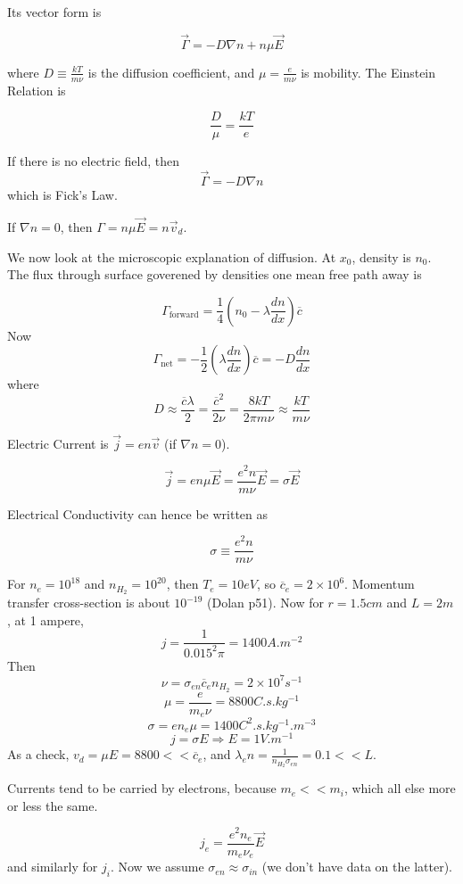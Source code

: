\documentclass[12pt]{article}
\begin{document}
Its vector form is

$$\vec \Gamma = -D\nabla n + n\mu\vec E$$

where $D \equiv \frac{kT}{m\nu}$ is the diffusion coefficient, and $\mu = \frac{e}{m\nu}$ is mobility. The Einstein Relation is

$$\frac{D}{\mu} = \frac{kT}{e}$$

If there is no electric field, then
$$\vec \Gamma = -D\nabla n$$
which is Fick's Law.

If $\nabla n = 0$, then $\Gamma = n\mu \vec E = n\vec v_d$.

We now look at the microscopic explanation of diffusion. At $x_0$, density is $n_0$. The flux through surface goverened by densities one mean free path away is

$$\Gamma_{\text{forward}} = \frac{1}{4} \left(n_0 - \lambda \frac{dn}{dx}\right)\overline c$$
Now
$$\Gamma_{\text{net}} = -\frac{1}{2} \left(\lambda \frac{dn}{dx}\right)\overline c = -D \frac{dn}{dx}$$
where
$$D \approx \frac{\overline c\lambda}{2} = \frac{\overline c^2}{2\nu} = \frac{8kT}{2\pi m\nu} \approx \frac{kT}{m\nu}$$

Electric Current is $\vec j = en\vec v$ (if $\nabla n = 0$).

$$\vec j = en\mu\vec E = \frac{e^2n}{m\nu} \vec E = \sigma \vec E$$

Electrical Conductivity can hence be written as

$$\sigma \equiv \frac{e^2n}{m\nu}$$

\begin{ex}
    For $n_e = 10^{18}$ and $n_{H_2} = 10^{20}$, then $T_e = 10\unit{eV}$, so $\overline c_e = 2 \times 10^6$. Momentum transfer cross-section is about $10^{-19}$ (Dolan p51). Now for $r = 1.5\unit{cm}$ and $L = 2\unit{m}$, at 1 ampere,
    $$j = \frac{1}{0.015^2\pi} = 1400 \unit{A.m^{-2}}$$
    Then
    $$\nu = \sigma_{en}\overline c_e n_{H_2} = 2\times10^7\unit{s^{-1}}$$
    $$\mu = \frac{e}{m_e\nu} = 8800 \unit{C.s.kg^{-1}}$$
    $$\sigma = en_e\mu = 1400 \unit{C^2.s.kg^{-1}.m^{-3}}$$
    $$j = \sigma E \Rightarrow E = 1\unit{V.m^{-1}}$$
    As a check, $v_d = \mu E = 8800 << \overline c_e$, and $\lambda_en = \frac{1}{n_{H_2}\sigma_{en}} = 0.1 << L$.
\end{ex}

Currents tend to be carried by electrons, because $m_e << m_i$, which all else more or less the same.

$$j_e = \frac{e^2n_e}{m_e\nu_e}\vec E$$
and similarly for $j_i$. Now we assume $\sigma_{en} \approx \sigma_{in}$ (we don't have data on the latter).
\end{document}
